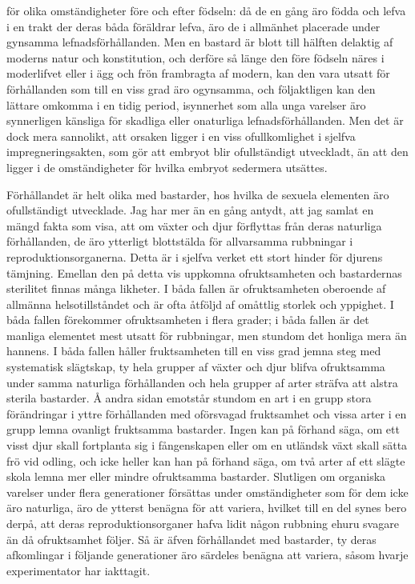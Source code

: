 för olika omständigheter före och efter födseln: då de en gång äro födda och lefva i en trakt der deras båda föräldrar lefva, äro de i allmänhet placerade under gynsamma lefnadsförhållanden. Men en bastard är blott till hälften delaktig af moderns natur och konstitution, och derföre så länge den före födseln näres i moderlifvet eller i ägg och frön frambragta af modern, kan den vara utsatt för förhållanden som till en viss grad äro ogynsamma, och följaktligen kan den lättare omkomma i en tidig period, isynnerhet som alla unga varelser äro synnerligen känsliga för skadliga eller onaturliga lefnadsförhållanden. Men det är dock mera sannolikt, att orsaken ligger i en viss ofullkomlighet i sjelfva impregneringsakten, som gör att embryot blir ofullständigt utveckladt, än att den ligger i de omständigheter för hvilka embryot sedermera utsättes.

Förhållandet är helt olika med bastarder, hos hvilka de sexuela elementen äro ofullständigt utvecklade. Jag har mer än en gång antydt, att jag samlat en mängd fakta som visa, att om växter och djur förflyttas från deras naturliga förhållanden, de äro ytterligt blottstälda för allvarsamma rubbningar i reproduktionsorganerna. Detta är i sjelfva verket ett stort hinder för djurens tämjning. Emellan den på detta vis uppkomna ofruktsamheten och bastardernas sterilitet finnas många likheter. I båda fallen är ofruktsamheten oberoende af allmänna helsotillståndet och är ofta åtföljd af omåttlig storlek och yppighet. I båda fallen förekommer ofruktsamheten i flera grader; i båda fallen är det manliga elementet mest utsatt för rubbningar, men stundom det honliga mera än hannens. I båda fallen håller fruktsamheten till en viss grad jemna steg med systematisk slägtskap, ty hela grupper af växter och djur blifva ofruktsamma under samma naturliga förhållanden och hela grupper af arter sträfva att alstra sterila bastarder. Å andra sidan emotstår stundom en art i en grupp stora förändringar i yttre förhållanden med oförsvagad fruktsamhet och vissa arter i en grupp lemna ovanligt fruktsamma bastarder. Ingen kan på förhand säga, om ett visst djur skall fortplanta sig i fångenskapen eller om en utländsk växt skall sätta frö vid odling, och icke heller kan han på förhand säga, om två arter af ett slägte skola lemna mer eller mindre ofruktsamma bastarder. Slutligen om organiska varelser under flera generationer försättas under omständigheter som för dem icke äro naturliga, äro de ytterst benägna för att variera, hvilket till en del synes bero derpå, att deras reproduktionsorganer hafva lidit någon rubbning ehuru svagare än då ofruktsamhet följer. Så är äfven förhållandet med bastarder, ty deras afkomlingar i följande generationer äro särdeles benägna att variera, såsom hvarje experimentator har iakttagit.

